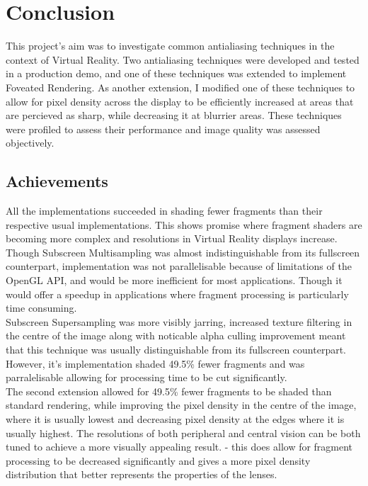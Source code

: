 \documentclass[12pt,a4paper,twoside,openright]{report}
\begin{document}
\chapter{Conclusion}

This project's aim was to investigate common antialiasing techniques in the context of Virtual Reality. Two antialiasing techniques were developed and tested in a production demo, and one of these techniques was extended to implement Foveated Rendering. As another extension, I modified one of these techniques to allow for pixel density across the display to be efficiently increased at areas that are percieved as sharp, while decreasing it at blurrier areas. These techniques were profiled to assess their performance and image quality was assessed objectively.  

\section{Achievements}

All the implementations succeeded in shading fewer fragments than their respective usual implementations.
This shows promise where fragment shaders are becoming more complex and resolutions in Virtual Reality displays increase.\\

Though Subscreen Multisampling was almost indistinguishable from its fullscreen counterpart, implementation was not parallelisable because of limitations of the OpenGL API, and would be more inefficient for most applications. Though it would offer a speedup in applications where fragment processing is particularly time consuming.\\

Subscreen Supersampling was more visibly jarring, increased texture filtering in the centre of the image along with noticable alpha culling improvement meant that this technique was usually distinguishable from its fullscreen counterpart.
However, it's implementation shaded 49.5\% fewer fragments and was parralelisable allowing for processing time to be cut significantly.\\

The second extension allowed for 49.5\% fewer fragments to be shaded than standard rendering, while improving the pixel density in the centre of the image, where it is usually lowest and decreasing pixel density at the edges where it is usually highest. The resolutions of both peripheral and central vision can be both tuned to achieve a more visually appealing result. - this does allow for fragment processing to be decreased significantly and gives a more pixel density distribution that better represents the properties of the lenses.\\
\end{document}
